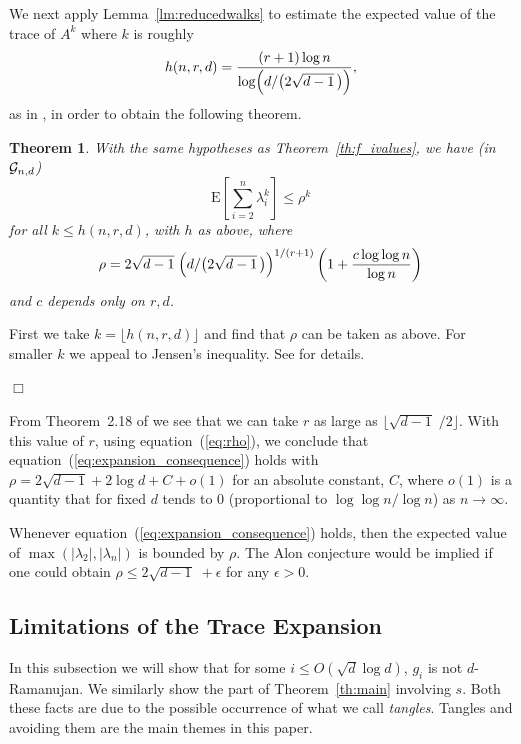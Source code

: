 \documentclass[12pt]{article}
\newtheorem{theorem}{Theorem}[section]
\newcommand{\dtreelike}{{$d$-Ramanujan}}
\newcommand{\cg}{{\cal G}}
\newcommand{\cgnd}{\cg_{n,d}}
\newcommand{\E}[1]{\mbox{E}\left[#1\right] }
\newcommand{\proof}{{\par\noindent {\bf Proof}\space\space}}
\newcommand{\proofbox}{\begin{flushright}$\Box$\end{flushright}}
\begin{document}
We next apply Lemma~\ref{lm:reducedwalks} to estimate the expected value
of the trace of $A^k$ where $k$ is roughly 
\begin{equation}\label{eq:hnrd}
h(n,r,d)=\frac{(r+1)\log n }{\log\Bigl( d/\bigl(2\sqrt{d-1}\,\bigr)\Bigr)} ,
\end{equation}
as in
\cite{friedman_random_graphs}, in order to obtain the following theorem.
\begin{theorem}\label{th:expansion_consequence}
With the same hypotheses as Theorem~\ref{th:f_ivalues},
we have (in $\cgnd$)
\begin{equation}\label{eq:expansion_consequence}
\E{  \sum_{i=2}^n \lambda_i^k} \le \rho^k
\end{equation}
for all $k\le h(n,r,d)$, with $h$ as above, where
\begin{equation}\label{eq:rho}
\rho = 2\sqrt{d-1}\; \Bigl( d/\bigl( 2\sqrt{d-1}\,\bigr) \Bigr)^{1/(r+1)}
\left( 1 + \frac{c\log\log n}{\log n} \right)
\end{equation}
and $c$ depends only on $r,d$.
\end{theorem}
\proof First we take $k=\lfloor h(n,r,d) \rfloor$ and find that $\rho$
can be taken as above.  For
smaller $k$ we appeal to Jensen's inequality.  See 
\cite{friedman_random_graphs} for details.
\proofbox
From Theorem~2.18 of \cite{friedman_random_graphs} we see that we
can take $r$ as large as $\lfloor \sqrt{d-1}\;/2\rfloor$.  With this
value of $r$, using equation~(\ref{eq:rho}), we conclude that
equation~(\ref{eq:expansion_consequence}) holds with
$\rho=2\sqrt{d-1}+2\log d + C+o(1)$ for an absolute constant, $C$, where
$o(1)$ is a quantity that for fixed $d$ tends to $0$
(proportional to $\log\log n/\log n$) as $n\to\infty$.

Whenever equation~(\ref{eq:expansion_consequence}) holds, 
then the expected value
of $\max(|\lambda_2|,|\lambda_n|)$ is bounded by $\rho$.  The Alon conjecture
would be implied if one could obtain $\rho\le 2\sqrt{d-1}\;+\epsilon$
for any $\epsilon>0$.




\subsection{Limitations of the Trace Expansion}

In this subsection we will show that for some $i\le O(\sqrt{d}\log d)$,
$g_i$ is not {\dtreelike}.  We similarly
show the part of Theorem~\ref{th:main} involving $s$.  Both these facts are
due to the possible occurrence of what we call {\em tangles}.
Tangles and avoiding them are the main themes in this paper.
\end{document}
